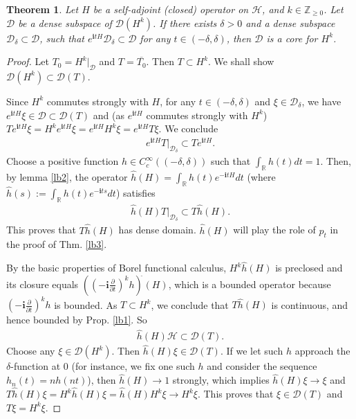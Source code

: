 \documentclass[12pt,a4paper,notitlepage]{article}
\theoremstyle{definition}
\theoremstyle{plain}
\newtheorem{thm}[df]{Theorem}
\newcommand{\wht}{\widehat}
\newcommand{\ovl}{\overline}
\newcommand{\Dom}{\scr D}
\newcommand{\scr}{\mathscr}
\newcommand{\im}{\mathbf{i}}
\newcommand{\Rbb}{\mathbb R}
\numberwithin{equation}{subsection}
\begin{document}
\begin{thm}\label{lb5}
	Let $H$ be a self-adjoint (closed) operator on $\mathcal H$, and $k\in\mathbb Z_{\geq0}$. Let $\Dom$ be a dense subspace of $\Dom(H^k)$. If there exists $\delta>0$ and a dense subspace $\Dom_\delta\subset\Dom$, such that $e^{\im tH}\Dom_\delta\subset\Dom$ for any $t\in(-\delta,\delta)$, then $\Dom$ is a core for $H^k$. 
\end{thm}
\begin{proof}
Let $T_0=H^k|_{\Dom}$ and $T=\ovl {T_0}$. Then $T\subset H^k$. We shall show $\Dom(H^k)\subset \Dom(T)$.



Since $H^k$ commutes strongly with $H$, for any $t\in(-\delta,\delta)$ and $\xi\in\Dom_\delta$, we have $e^{\im tH}\xi\in\Dom\subset\Dom(T)$ and (as $e^{\im tH}$ commutes strongly with $H^k$) $Te^{\im tH}\xi=H^ke^{\im tH}\xi=e^{\im tH}H^k\xi=e^{\im tH}T\xi$. We conclude
\begin{align*}
e^{\im tH}T\big|_{\Dom_\delta}\subset Te^{\im tH}.
\end{align*}
Choose a positive function $h\in C^\infty_c((-\delta,\delta))$ such that $\int_{\mathbb R} h(t)dt=1$. Then, by lemma \ref{lb2}, the operator $\widehat h(H)=\int_{\mathbb R}h(t)e^{-\im tH}dt$ (where $\wht h(s):=\int_\Rbb h(t)e^{-\im ts}dt$) satisfies 
\begin{align*}
\widehat h(H)T\big|_{\Dom_\delta}\subset T\wht h(H).
\end{align*}
This proves that $T\wht h(H)$ has dense domain. $\wht h(H)$ will play the role of $p_t$ in the proof of Thm. \ref{lb3}.
	
By the basic properties of Borel functional calculus, $H^k\widehat h(H)$ is preclosed and its closure equals $((-\im\frac{\partial}{\partial t})^kh)^{\widehat{}}(H)$, which is a bounded operator because $(-\im\frac{\partial}{\partial t})^kh$ is bounded. As $T\subset H^k$, we conclude that  $T\widehat h(H)$ is continuous, and hence bounded by Prop. \ref{lb1}. So
\begin{align*}
\widehat h(H)\mathcal H\subset\Dom(T).
\end{align*}
Choose any $\xi\in\Dom(H^k)$. Then $\wht h(H)\xi\in\Dom (T)$. If we let such $h$ approach the $\delta$-function at $0$ (for instance, we fix one such $h$ and consider the sequence $h_n(t)=nh(nt)$), then $\widehat h(H)\rightarrow 1$ strongly, which implies $\widehat h(H)\xi\rightarrow\xi$ and $T\wht h(H)\xi= H^k\wht h(H)\xi=\wht h(H)H^k\xi\rightarrow H^k\xi$. This proves that $\xi\in\Dom(T)$ and $T\xi=H^k\xi$.
\end{proof}	
	
\end{document}
